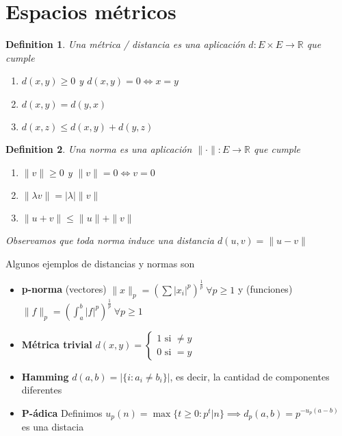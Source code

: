 \documentclass[leqno]{article}
\newtheorem*{definition}{Definition}
\begin{document}
\section{Espacios métricos}
\begin{definition}
Una métrica / distancia es una aplicación $d:E\times E\to \mathbb{R}$ que cumple
\begin{enumerate}[topsep=-6pt, itemsep=0pt]
  \item $d(x, y)\ge 0$ y $d(x, y)=0 \iff x=y$
  \item $d(x, y)=d(y, x)$
  \item $d(x, z) \le d(x, y) + d(y, z)$
\end{enumerate}
\end{definition}

\begin{definition}
Una norma es una aplicación $\|\cdot \|: E\to \mathbb{R}$ que cumple
\begin{enumerate}[topsep=-6pt, itemsep=0pt]
  \item $\|v\|\ge 0$ y $\|v\|=0 \iff v=0$
  \item $\|\lambda v\| =  |\lambda |\|v\|$
  \item  $\|u+v\|\le  \|u\|+\|v\|$
\end{enumerate}
Observamos que toda norma induce una distancia $d(u, v)=\|u-v\|$
\end{definition}

Algunos ejemplos de distancias y normas son
\begin{itemize}[topsep=-6pt, itemsep=0pt]
  \item \textbf{p-norma} (vectores) $\displaystyle\|x\|_p = \left(\sum |x_i|^p\right)^{\frac{1}{p}} \ \forall p\ge 1$ y (funciones) $\displaystyle\|f\|_p = \left(\int_a^b |f|^p\right)^{\frac{1}{p}} \ \forall p\ge 1$
  \item \textbf{Métrica trivial} $d(x, y) = \begin{cases}
    1 \text{ si } \neq  y\\
    0 \text{ si } = y
  \end{cases}$   
  \item \textbf{Hamming} $d(a, b)=|\{i:a_i\neq b_i\}|$, es decir, la cantidad de componentes diferentes
  \item \textbf{P-ádica} Definimos $u_p(n) = \max\{t\ge 0:p^t|n\}\implies d_p(a, b) = p^{-u_p(a-b)}$ es una distacia
\end{itemize}
\end{document}
